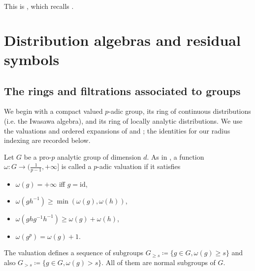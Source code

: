 \documentclass[11pt]{article}
\newtheorem{corollary}[theorem]{Corollary}
\theoremstyle{definition}
\newcommand{\gr}{\operatorname{gr}}
\begin{document}
This is \cite[Definition~6.4 and Theorem~6.5]{HuWangPadic},
which recalls \cite[Theorem~5.23]{BjorkEkstrom1990}.


\section{Distribution algebras and residual symbols}
\label{sec:distributions}
\subsection{The rings and filtrations associated to groups}
\label{sec:group-filtrations}
We begin with a compact valued $p$-adic group, its ring of continuous distributions (i.e. the Iwasawa algebra), and its ring of locally analytic distributions. 
We use the valuations and ordered expansions of \cite[\S4]{ST03}
and \cite[\S3]{Sorgdrager2026}; the identities for our radius indexing
are recorded below.

Let $G$ be a pro-$p$ analytic group of dimension $d$. 
As in \cite[III, \S2.1.2]{Lazard1965}, a function $\omega\colon G\to (\frac{1}{p-1}, +\infty]$ is called a $p$-adic valuation if it satisfies
\begin{itemize}
      \item $\omega(g)=+\infty$ iff $g=\mathrm{id}$, 
      \item $\omega(gh^{-1})\ge\min(\omega(g), \omega(h))$, 
      \item $\omega(ghg^{-1}h^{-1})\ge\omega(g)+\omega(h)$,
      \item $\omega(g^p)=\omega(g)+1$.
\end{itemize}
The valuation defines a sequence of subgroups $G_{\ge s}\coloneqq\{g\in G, \omega(g)\ge s\}$ and also $G_{> s}\coloneqq\{g\in G, \omega(g)> s\}$.
All of them are normal subgroups of $G$. 
\end{document}
